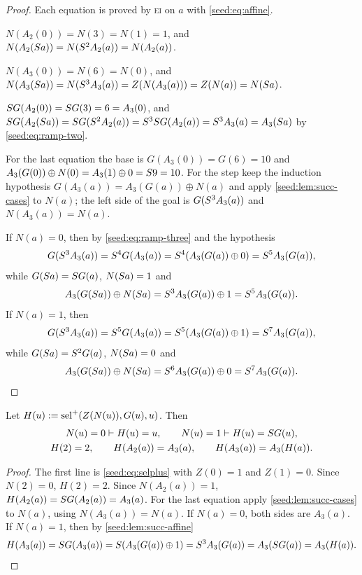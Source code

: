 \begin{proof}
Each equation is proved by \textsc{ei} on $a$ with \eqref{seed:eq:affine}.

$N(A_2(0))=N(3)=N(1)=1$, and
$N(A_2(S a))=N(S^2A_2(a))=N(A_2(a))$.

$N(A_3(0))=N(6)=N(0)$, and
$N(A_3(S a))=N(S^3A_3(a))=Z(N(A_3(a)))=Z(N(a))=N(S a)$.

$S G(A_2(0))=S G(3)=6=A_3(0)$, and
$S G(A_2(S a))=S G(S^2A_2(a))=S^3S G(A_2(a))
=S^3A_3(a)=A_3(S a)$ by \eqref{seed:eq:ramp-two}.

For the last equation the base is $G(A_3(0))=G(6)=10$ and
$A_3(G(0))\oplus N(0)=A_3(1)\oplus0=S 9=10$. For the step keep the
induction hypothesis $G(A_3(a))=A_3(G(a))\oplus N(a)$ and apply
\cref{seed:lem:succ-cases} to $N(a)$; the left side of the goal is
$G(S^3A_3(a))$ and $N(A_3(a))=N(a)$.

If $N(a)=0$, then by \eqref{seed:eq:ramp-three} and the hypothesis
\[
 G(S^3A_3(a))=S^4G(A_3(a))=S^4(A_3(G(a))\oplus0)=S^5A_3(G(a)),
\]
while $G(S a)=S G(a)$, $N(S a)=1$ and
\[
 A_3(G(S a))\oplus N(S a)=S^3A_3(G(a))\oplus1=S^5A_3(G(a)).
\]
If $N(a)=1$, then
\[
 G(S^3A_3(a))=S^5G(A_3(a))=S^5(A_3(G(a))\oplus1)=S^7A_3(G(a)),
\]
while $G(S a)=S^2G(a)$, $N(S a)=0$ and
\[
 A_3(G(S a))\oplus N(S a)=S^6A_3(G(a))\oplus0=S^7A_3(G(a)).
 \qedhere
\]
\end{proof}

\begin{lemma}\label{seed:lem:succ-factor}
Let $H(u)\mathrel{:=}\operatorname{sel}^{+}(Z(N(u)),G(u),u)$. Then
\begin{gather*}
 N(u)=0\vdash H(u)=u,\qquad N(u)=1\vdash H(u)=S G(u),\\
 H(2)=2,\qquad H(A_2(a))=A_3(a),\qquad H(A_3(a))=A_3(H(a)).
\end{gather*}
\end{lemma}

\begin{proof}
The first line is \eqref{seed:eq:selplus} with $Z(0)=1$ and $Z(1)=0$. Since
$N(2)=0$, $H(2)=2$. Since $N(A_2(a))=1$,
$H(A_2(a))=S G(A_2(a))=A_3(a)$. For the last equation apply
\cref{seed:lem:succ-cases} to $N(a)$, using $N(A_3(a))=N(a)$. If $N(a)=0$,
both sides are $A_3(a)$. If $N(a)=1$, then by \cref{seed:lem:succ-affine}
\[
 H(A_3(a))=S G(A_3(a))=S(A_3(G(a))\oplus1)=S^3A_3(G(a))
 =A_3(S G(a))=A_3(H(a)). \qedhere
\]
\end{proof}

